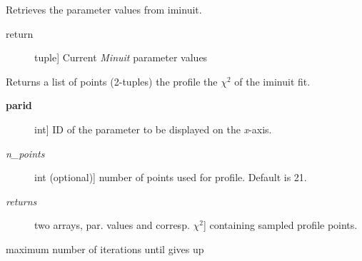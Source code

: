 \documentclass[a4paper,10pt,english]{sphinxmanual}
\begin{document}
\begin{fulllineitems}
\begin{fulllineitems}
\begin{description}
\end{description}

\end{fulllineitems}


\begin{fulllineitems}
\label{module_doc:kafe.iminuit_wrapper.IMinuit.get_parameter_values}
Retrieves the parameter values from iminuit.
\begin{description}
\item[{return}] \leavevmode{[}tuple{]}
Current \emph{Minuit} parameter values

\end{description}

\end{fulllineitems}


\begin{fulllineitems}
\label{module_doc:kafe.iminuit_wrapper.IMinuit.get_profile}
Returns a list of points (2-tuples) the profile
the \(\chi^2\)  of the iminuit fit.
\begin{description}
\item[{\textbf{parid}}] \leavevmode{[}int{]}
ID of the parameter to be displayed on the \emph{x}-axis.

\item[{\emph{n\_points}}] \leavevmode{[}int (optional){]}
number of points used for profile. Default is 21.

\item[{\emph{returns}}] \leavevmode{[}two arrays, par. values and corresp. \(\chi^2\){]}
containing  sampled profile points.

\end{description}

\end{fulllineitems}


\begin{fulllineitems}
\label{module_doc:kafe.iminuit_wrapper.IMinuit.max_iterations}
maximum number of iterations until  gives up


\end{fulllineitems}
\end{fulllineitems}
\end{document}
